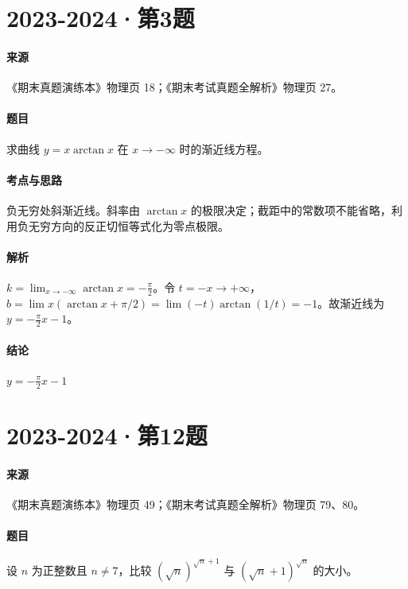 \documentclass[UTF8,fontset=fandol,12pt,oneside,openany]{ctexrep}
\theoremstyle{definition}
\begin{document}
\par\addvspace{18pt}\noindent\begin{minipage}{\linewidth}
\section{2023-2024·第3题}
\paragraph{来源}《期末真题演练本》物理页 18；《期末考试真题全解析》物理页 27。
\paragraph{题目}
求曲线 $y=x\arctan x$ 在 $x\to-\infty$ 时的渐近线方程。
\end{minipage}\par
\paragraph{考点与思路}
负无穷处斜渐近线。斜率由 $\arctan x$ 的极限决定；截距中的常数项不能省略，利用负无穷方向的反正切恒等式化为零点极限。
\paragraph{解析}
$k=\lim_{x\to-\infty}\arctan x=-\frac\pi2$。令 $t=-x\to+\infty$，$b=\lim x(\arctan x+\pi/2)=\lim(-t)\arctan(1/t)=-1$。故渐近线为 $y=-\frac\pi2x-1$。
\paragraph{结论}
$y=-\frac\pi2x-1$

\par\addvspace{18pt}\noindent\begin{minipage}{\linewidth}
\section{2023-2024·第12题}
\paragraph{来源}《期末真题演练本》物理页 49；《期末考试真题全解析》物理页 79、80。
\paragraph{题目}
设 $n$ 为正整数且 $n\ne7$，比较 $(\sqrt n)^{\sqrt n+1}$ 与 $(\sqrt n+1)^{\sqrt n}$ 的大小。
\end{minipage}\par
\end{document}
